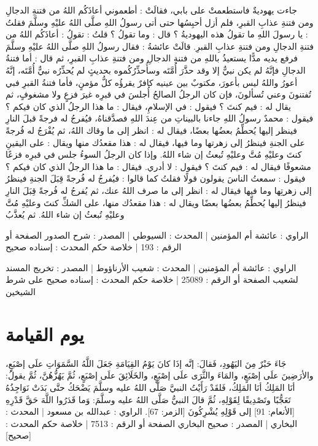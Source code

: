 جاءت يهوديةٌ فاستطعمتْ على بابي، فقالَتْ : أطعموني أعاذَكُم اللهُ من فتنةِ الدجالِ ومن فتنةِ عذابِ القبرِ، فلم أزل أحبِسُها حتى أتى رسولُ اللهِ صلَّى اللهُ عليْهِ وسلَّمَ فقلتُ : يا رسولَ اللهِ ما تقولُ هذه اليهوديةُ ؟ قال : وما تقولُ ؟ قلتُ : تقولُ : أعاذَكُم اللهُ من فتنةِ الدجالِ ومن فتنةِ عذابِ القبرِ. قالَتْ عائشةُ : فقال رسولُ اللهِ صلَّى اللهُ عليْهِ وسلَّمَ فرفع يديه مدًّا يستعيذُ باللهِ من فتنةِ الدجالِ ومن فتنةِ عذابِ القبرِ، ثم قال : أما فتنةُ الدجالِ فإنَّهُ لم يكن نبيٌّ إلا وقد حذَّرَ أُمَّتَه وسأُحذِّرُكُموه بحديثٍ لم يُحذِّرُه نبيٌّ أُمَّتَه، إنَّهُ أعورُ واللهُ ليس بأعورَ، مكتوبٌ بين عينيه كافرٌ يقرؤُه كلُّ مؤمنٍ، فأما فتنةُ القبرِ فبي تُفتنونَ وعني تُسألونَ، فإن كان الرجلُ الصالحُ أُجلسَ في قبرِه غيرَ فزعٍ ولا مشغوفٍ، ثم يقال له : فيم كنتَ ؟ فيقول : في الإسلامِ، فيقال : ما هذا الرجلُ الذي كان فيكم ؟ فيقول : محمدٌ رسولُ اللهِ جاءنا بالبيناتِ من عِندَ اللهِ فصدَّقناهُ، فيُفرجُ له فرجةً قبلَ النارِ فينظر إليها يُحطِّمُ بعضُها بعضًا، فيقال له : انظر إلى ما وقاك اللهُ، ثم يُفْرَجُ له فُرجةً على الجنةِ فينظرُ إلى زهرتها وما فيها، فيقال له : هذا مقعدُك منها ويقال : على اليقينِ كنتَ وعليْهِ مُتَّ وعليْهِ تُبعثُ إن شاء اللهُ. وإذا كان الرجلُ السوءُ جلس في قبرِه فزعًا مشعوفًا فيقال له : فيم كنتَ ؟ فيقول : لا أدري. فيقال : ما هذا الرجلُ الذي كان فيكم ؟ فيقول : سمعتُ الناسَ يقولون قولًا فقلتُ كما قالوا : فيُفرجُ له فُرجةً قِبَلَ الجنةِ فينظرُ إلى زهرتِها وما فيها فيقال له : انظر إلى ما صرف اللهُ عنك، ثم يُفرجُ له فُرجةً قِبَلَ النارِ فينظرُ إليها يُحطِّمُ بعضُها بعضًا ويقال له : هذا مقعدُك منها، على الشكِّ كنتَ وعليْهِ مُتَّ وعليْهِ تُبعثُ إن شاء اللهُ. ثم يُعذَّبُ

الراوي : عائشة أم المؤمنين | المحدث : السيوطي | المصدر : شرح الصدور
الصفحة أو الرقم : 193 | خلاصة حكم المحدث : إسناده صحيح 

الراوي : عائشة أم المؤمنين | المحدث : شعيب الأرناؤوط | المصدر : تخريج المسند لشعيب
الصفحة أو الرقم : 25089 | خلاصة حكم المحدث : إسناده صحيح على شرط الشيخين 

\section{يوم القيامة}


جَاءَ حَبْرٌ مِنَ اليَهُودِ، فَقالَ: إنَّه إذَا كانَ يَوْمُ القِيَامَةِ جَعَلَ اللَّهُ السَّمَوَاتِ علَى إصْبَعٍ، والأرَضِينَ علَى إصْبَعٍ، والمَاءَ والثَّرَى علَى إصْبَعٍ، والخَلَائِقَ علَى إصْبَعٍ، ثُمَّ يَهُزُّهُنَّ، ثُمَّ يقولُ: أنَا المَلِكُ أنَا المَلِكُ، فَلقَدْ رَأَيْتُ النبيَّ صَلَّى اللهُ عليه وسلَّمَ يَضْحَكُ حتَّى بَدَتْ نَوَاجِذُهُ تَعَجُّبًا وتَصْدِيقًا لِقَوْلِهِ، ثُمَّ قالَ النبيُّ صَلَّى اللهُ عليه وسلَّمَ: {وَما قَدَرُوا اللَّهَ حَقَّ قَدْرِهِ} [الأنعام: 91] إلى قَوْلِهِ {يُشْرِكُونَ} [الزمر: 67].
الراوي : عبدالله بن مسعود | المحدث : البخاري | المصدر : صحيح البخاري
الصفحة أو الرقم : 7513 | خلاصة حكم المحدث : [صحيح]

